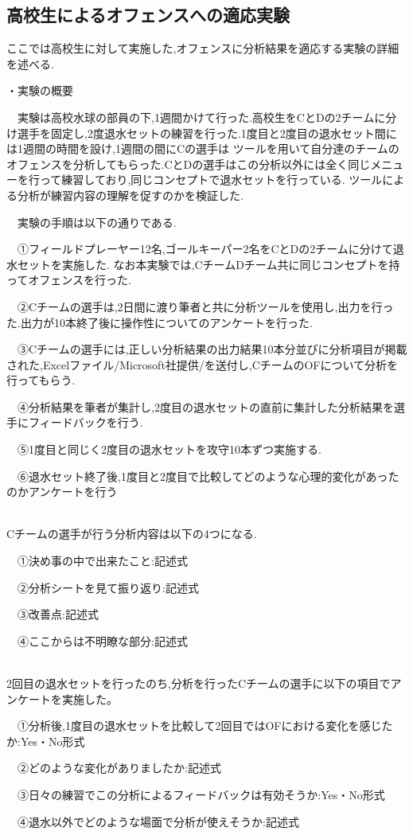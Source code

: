 \documentclass[../main.tex]{subfiles}
\begin{document}
\subsection{高校生によるオフェンスへの適応実験}
ここでは高校生に対して実施した,オフェンスに分析結果を適応する実験の詳細を述べる.\par
・実験の概要
\par　実験は高校水球の部員の下,1週間かけて行った.高校生をCとDの2チームに分け選手を固定し,2度退水セットの練習を行った.1度目と2度目の退水セット間には1週間の時間を設け,1週間の間にCの選手は
ツールを用いて自分達のチームのオフェンスを分析してもらった.CとDの選手はこの分析以外には全く同じメニューを行って練習しており,同じコンセプトで退水セットを行っている.
ツールによる分析が練習内容の理解を促すのかを検証した.
\par　実験の手順は以下の通りである.
\par　①フィールドプレーヤー12名,ゴールキーパー2名をCとDの2チームに分けて退水セットを実施した.
なお本実験では,CチームDチーム共に同じコンセプトを持ってオフェンスを行った.
\par　②Cチームの選手は,2日間に渡り筆者と共に分析ツールを使用し,出力を行った.出力が10本終了後に操作性についてのアンケートを行った.
\par　③Cチームの選手には,正しい分析結果の出力結果10本分並びに分析項目が掲載された,Excelファイル{/Microsoft社提供/}を送付し,CチームのOFについて分析を行ってもらう.
\par　④分析結果を筆者が集計し,2度目の退水セットの直前に集計した分析結果を選手にフィードバックを行う.
\par　⑤1度目と同じく2度目の退水セットを攻守10本ずつ実施する.
\par　⑥退水セット終了後,1度目と2度目で比較してどのような心理的変化があったのかアンケートを行う


\leavevmode\\
Cチームの選手が行う分析内容は以下の4つになる.
\par　①決め事の中で出来たこと:記述式
\par　②分析シートを見て振り返り:記述式
\par　③改善点:記述式
\par　④ここからは不明瞭な部分:記述式


\leavevmode\\
2回目の退水セットを行ったのち,分析を行ったCチームの選手に以下の項目でアンケートを実施した。
\par　①分析後,1度目の退水セットを比較して2回目ではOFにおける変化を感じたか:Yes・No形式
\par　②どのような変化がありましたか:記述式
\par　③日々の練習でこの分析によるフィードバックは有効そうか:Yes・No形式
\par　④退水以外でどのような場面で分析が使えそうか:記述式
\end{document}

